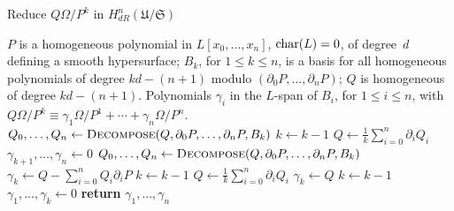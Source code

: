 \begin{algorithm}
\caption{Reduce $Q \Omega / P^k$ in $H_{dR}^n(\mathfrak{U}/\mathfrak{S})$}
\label{alg:PoleReduction}
\begin{algorithmic}
\vspace{1mm}
\Require $P$ is a homogeneous polynomial in $L[x_0, \dotsc, x_n]$, 
         $\operatorname{char}(L) = 0$, of degree~$d$ defining a smooth hypersurface; 
         $B_k$, for $1 \leq k \leq n$, is a basis for all homogeneous 
         polynomials of degree $kd - (n+1)$ modulo 
         $(\partial_0 P, \dotsc, \partial_n P)$;  $Q$ is homogeneous of 
         degree $kd - (n+1)$.
\Ensure  Polynomials $\gamma_i$ in the $L$-span of $B_i$, 
         for $1 \leq i \leq n$, with  
         $Q \Omega / P^k \equiv \gamma_{1} \Omega / P^{1} + \dotsb + \gamma_n \Omega / P^n$.
\State $Q_0, \dotsc, Q_n \gets \Call{Decompose}{Q, \partial_0 P, \dotsc, \partial_n P, B_k}$
\State $k \gets k-1$
\State $Q \gets \tfrac{1}{k} \sum_{i=0}^n \partial_i Q_i$
\EndWhile
\State $\gamma_{k+1}, \dotsc, \gamma_{n} \gets 0$
\State $Q_0, \dotsc, Q_n \gets \Call{Decompose}{Q, \partial_0 P, \dotsc, \partial_n P, B_k}$
\State $\gamma_{k} \gets Q - \sum_{i=0}^n Q_i \partial_i P$
\State $k \gets k-1$
\State $Q \gets \tfrac{1}{k} \sum_{i=0}^n \partial_i Q_i$
\EndWhile
{}
\State $\gamma_{k} \gets Q$
\State $k \gets k-1$
\EndIf
\State $\gamma_{1}, \dotsc, \gamma_{k} \gets 0$
\State \textbf{return} $\gamma_{1}, \dotsc, \gamma_n$
\EndProcedure
\end{algorithmic}
\end{algorithm}


